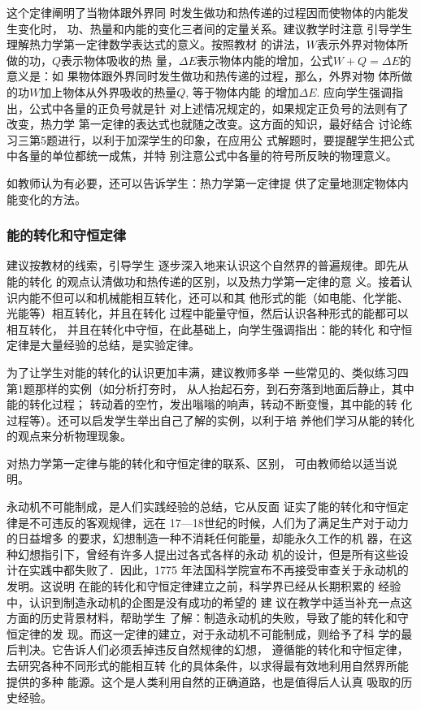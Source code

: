 这个定律阐明了当物体跟外界同
时发生做功和热传递的过程因而使物体的内能发生变化时，
功、热量和内能的变化三者间的定量关系。建议教学时注意
引导学生理解热力学第一定律数学表达式的意义。按照教材
的讲法，$W$表示外界对物体所做的功，$Q$表示物体吸收的热
量，$\Delta E$表示物体内能的增加，公式$W+Q=\Delta E$的意义是：如
果物体跟外界同时发生做功和热传递的过程，那么，外界对物
体所做的功$W$加上物体从外界吸收的热量$Q$, 等于物体内能
的增加$\Delta E$. 应向学生强调指出，公式中各量的正负号就是针
对上述情况规定的，如果规定正负号的法则有了改变，热力学
第一定律的表达式也就随之改变。这方面的知识，最好结合
讨论练习三第5题进行，以利于加深学生的印象，在应用公
式解题时，要提醒学生把公式中各量的单位都统一成焦，并特
别注意公式中各量的符号所反映的物理意义。

如教师认为有必要，还可以告诉学生：热力学第一定律提
供了定量地测定物体内能变化的方法。

\subsubsection{能的转化和守恒定律}

建议按教材的线索，引导学生
逐步深入地来认识这个自然界的普遍规律。即先从能的转化
的观点认清做功和热传递的区别，以及热力学第一定律的意
义。接着认识内能不但可以和机械能相互转化，还可以和其
他形式的能（如电能、化学能、光能等）相互转化，并且在转化
过程中能量守恒，然后认识各种形式的能都可以相互转化，
并且在转化中守恒，在此基础上，向学生强调指出：能的转化
和守恒定律是大量经验的总结，是实验定律。

为了让学生对能的转化的认识更加丰满，建议教师多举
一些常见的、类似练习四第1题那样的实例（如分析打夯时，
从人抬起石夯，到石夯落到地面后静止，其中能的转化过程；
转动着的空竹，发出嗡嗡的响声，转动不断变慢，其中能的转
化过程等）。还可以启发学生举出自己了解的实例，以利于培
养他们学习从能的转化的观点来分析物理现象。

对热力学第一定律与能的转化和守恒定律的联系、区别，
可由教师给以适当说明。

永动机不可能制成，是人们实践经验的总结，它从反面
证实了能的转化和守恒定律是不可违反的客观规律，远在
17—18世纪的时候，人们为了满足生产对于动力的日益增多
的要求，幻想制造一种不消耗任何能量，却能永久工作的机
器，在这种幻想指引下，曾经有许多人提出过各式各样的永动
机的设计，但是所有这些设计在实践中都失败了．因此，1775
年法国科学院宣布不再接受审查关于永动机的发明。这说明
在能的转化和守恒定律建立之前，科学界已经从长期积累的
经验中，认识到制造永动机的企图是没有成功的希望的 建
议在教学中适当补充一点这方面的历史背景材料，帮助学生
了解：制造永动机的失败，导致了能的转化和守恒定律的发
现。而这一定律的建立，对于永动机不可能制成，则给予了科
学的最后判决。它告诉人们必须丢掉违反自然规律的幻想，
遵循能的转化和守恒定律，去研究各种不同形式的能相互转
化的具体条件，以求得最有效地利用自然界所能提供的多种
能源。这个是人类利用自然的正确道路，也是值得后人认真
吸取的历史经验。

